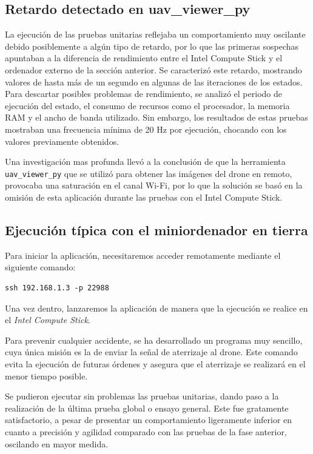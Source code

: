 \subsection{Retardo detectado en uav\_viewer\_py}

La ejecución de las pruebas unitarias reflejaba un comportamiento muy oscilante debido posiblemente a algún tipo de retardo, por lo que las primeras sospechas apuntaban a la diferencia de rendimiento entre el Intel Compute Stick y el ordenador externo de la sección anterior. Se caracterizó este retardo, mostrando valores de hasta más de un segundo en algunas de las iteraciones de los estados. Para descartar posibles problemas de rendimiento, se analizó el periodo de ejecución del estado, el consumo de recursos como el procesador, la memoria RAM y el ancho de banda utilizado. Sin embargo, los resultados de estas pruebas mostraban una frecuencia mínima de 20 Hz por ejecución, chocando con los valores previamente obtenidos.

Una investigación mas profunda llevó a la conclusión de que la herramienta \texttt{uav\_viewer\_py} que se utilizó para obtener las imágenes del drone en remoto, provocaba una saturación en el canal Wi-Fi, por lo que la solución se basó en la omisión de esta aplicación durante las pruebas con el Intel Compute Stick.



\subsection{Ejecución típica con el miniordenador en tierra}

Para iniciar la aplicación, necesitaremos acceder remotamente mediante el siguiente comando: 

\begin{lstlisting}[backgroundcolor=\color{gray!15}]
ssh 192.168.1.3 -p 22988
\end{lstlisting}

Una vez dentro, lanzaremos la aplicación de manera que la ejecución se realice en el \textit{Intel Compute Stick}.

Para prevenir cualquier accidente, se ha desarrollado un programa muy sencillo, cuya única misión es la de enviar la señal de aterrizaje al drone. Este comando evita la ejecución de futuras órdenes y asegura que el aterrizaje se realizará en el menor tiempo posible.

Se pudieron ejecutar sin problemas las pruebas unitarias, dando paso a la realización de la última prueba global o ensayo general. Este fue gratamente satisfactorio, a pesar de presentar un comportamiento ligeramente inferior en cuanto a precisión y agilidad comparado con las pruebas de la fase anterior, oscilando en mayor medida.

